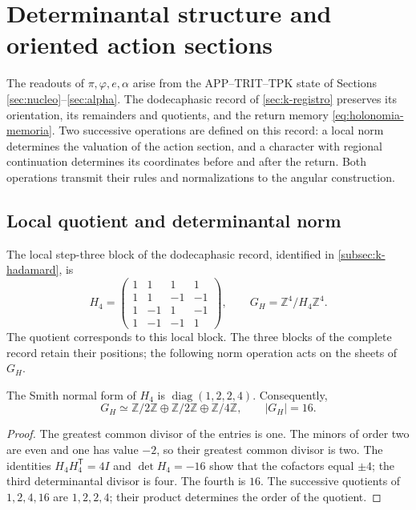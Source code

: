 \section{Determinantal structure and oriented action sections}
\label{iv:action:section}

The readouts of \(\pi,\varphi,e,\alpha\) arise from the
APP--TRIT--TPK state of Sections
\ref{sec:nucleo}--\ref{sec:alpha}. The dodecaphasic record of
\ref{sec:k-registro} preserves its orientation, its remainders and
quotients, and the return memory
\eqref{eq:holonomia-memoria}. Two successive operations are defined on
this record: a local norm determines the valuation of the action
section, and a character with regional continuation determines its
coordinates before and after the return. Both operations transmit
their rules and normalizations to the angular construction.

\subsection{Local quotient and determinantal norm}
\label{iv:action:determinantal}

The local step-three block of the dodecaphasic record, identified
in \ref{subsec:k-hadamard}, is
\begin{equation}
 H_4=\begin{pmatrix}
 1&1&1&1\\
 1&1&-1&-1\\
 1&-1&1&-1\\
 1&-1&-1&1
 \end{pmatrix},
 \qquad G_H=\mathbb Z^4/H_4\mathbb Z^4.
 \label{iv:action:h4}
\end{equation}
The quotient corresponds to this local block. The three blocks of
the complete record retain their positions; the following norm
operation acts on the sheets of \(G_H\).

\begin{lemma}
\label{iv:action:smith}
The Smith normal form of \(H_4\) is
\(\operatorname{diag}(1,2,2,4)\). Consequently,
\[
 G_H\simeq\mathbb Z/2\mathbb Z\oplus\mathbb Z/2\mathbb Z
       \oplus\mathbb Z/4\mathbb Z,\qquad |G_H|=16.
\]
\end{lemma}
\begin{proof}
The greatest common divisor of the entries is one. The minors of
order two are even and one has value \(-2\), so their greatest
common divisor is two. The identities
\(H_4H_4^{\mathsf T}=4I\) and \(\det H_4=-16\) show that the
cofactors equal \(\pm4\); the third determinantal divisor is
four. The fourth is \(16\). The successive quotients of
\(1,2,4,16\) are \(1,2,2,4\); their product determines the order
of the quotient.
\end{proof}

